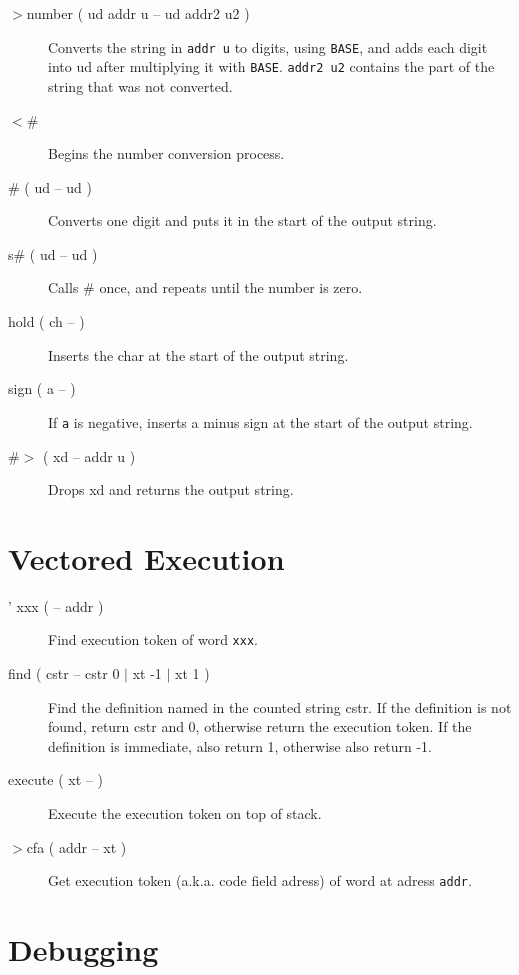 \begin{description}

\item[$>$number ( ud addr u -- ud addr2 u2 )] Converts the string in \texttt{addr u} to digits, using \texttt{BASE}, and adds each digit into ud after multiplying it with \texttt{BASE}. \texttt{addr2 u2} contains the part of the string that was not converted.

\item[$<$\#] Begins the number conversion process.
\item[\# ( ud -- ud )] Converts one digit and puts it in the start of the output string.
\item[s\# ( ud -- ud )] Calls \# once, and repeats until the number is zero.
\item[hold ( ch -- )] Inserts the char at the start of the output string.
\item[sign ( a -- )] If \texttt{a} is negative, inserts a minus sign at the start of the output string.
\item[\#$>$ ( xd -- addr u )] Drops xd and returns the output string.

\end{description}

\section{Vectored Execution}

\begin{description}
\item[' xxx ( -- addr )] Find execution token of word \texttt{xxx}.
\item[find ( cstr -- cstr 0 $\vert$ xt -1 $\vert$ xt 1 )] Find the definition named in the counted string cstr. If the definition is not found, return cstr and 0, otherwise return the execution token. If the definition is immediate, also return 1, otherwise also return -1.
\item[execute ( xt -- )] Execute the execution token on top of stack.
\item[$>$cfa ( addr -- xt )] Get execution token (a.k.a. code field adress) of word at adress \texttt{addr}.

\end{description}

\section{Debugging}

